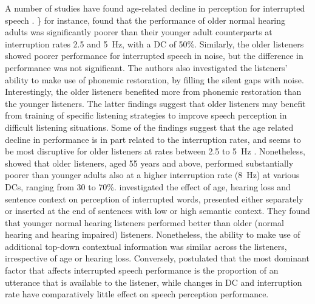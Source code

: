 \documentclass[a4paper, twoside]{templates/ociamthesis}
\begin{document}
A number of studies have found age-related decline in perception for interrupted speech \autocites[e.g.,][]{Bergman1976,Saija2014}. \textcite{Saija2014}\} for instance, found that the performance of older normal hearing adults was significantly poorer than their younger adult counterparts at interruption rates 2.5 and 5~Hz, with a DC of 50\%. Similarly, the older listeners showed poorer performance for interrupted speech in noise, but the difference in performance was not significant. The authors also investigated the listeners' ability to make use of phonemic restoration, by filling the silent gaps with noise. Interestingly, the older listeners benefited more from phonemic restoration than the younger listeners. The latter findings suggest that older listeners may benefit from training of specific listening strategies to improve speech perception in difficult listening situations. Some of the findings suggest that the age related decline in performance is in part related to the interruption rates, and seems to be most disruptive for older listeners at rates between 2.5 to 5~Hz \autocite{Shafiro2015}. Nonetheless, \textcite{Bergman1980} showed that older listeners, aged 55 years and above, performed substantially poorer than younger adults also at a higher interruption rate (8~Hz) at various DCs, ranging from 30 to 70\%. \textcite{Kidd2012} investigated the effect of age, hearing loss and sentence context on perception of interrupted words, presented either separately or inserted at the end of sentences with low or high semantic context. They found that younger normal hearing listeners performed better than older (normal hearing and hearing impaired) listeners. Nonetheless, the ability to make use of additional top-down contextual information was similar across the listeners, irrespective of age or hearing loss. Conversely, \textcite{Kidd2012} postulated that the most dominant factor that affects interrupted speech performance is the proportion of an utterance that is available to the listener, while changes in DC and interruption rate have comparatively little effect on speech perception performance.\\
\end{document}
